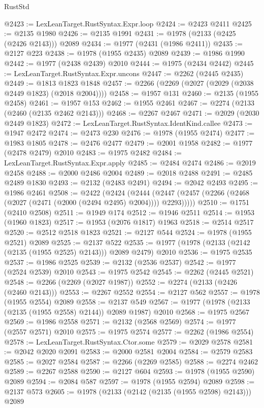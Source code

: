 \begin{lexlean}{RustStd}
\begin{coremodule}
@2423 := LexLeanTarget.RustSyntax.Expr.loop
@2424 := @2423 @2411
@2425 := @2135 @1980
@2426 := @2135 @1991
@2431 := @1978 (@2133 (@2425 (@2426 @2143))) @2089
@2434 := @1977 (@2431 (@1986 @2411))
@2435 := @2127 @223
@2438 := @1978 (@1955 @2435) @2089
@2439 := @1986 @1990
@2442 := @1977 (@2438 @2439) @2010
@2444 := @1975 (@2434 @2442)
@2445 := LexLeanTarget.RustSyntax.Expr.uncons
@2447 := @2262 (@2445 @2435)
@2449 := @1813 @1823 @1848
@2457 := @2266 (@2269 (@2027 (@2029 (@2038 @2449 @1823) (@2018 @2004))))
@2458 := @1957 @131
@2460 := @2135 (@1955 @2458)
@2461 := @1957 @153
@2462 := @1955 @2461
@2467 := @2274 (@2133 (@2460 (@2135 @2462 @2143)))
@2468 := @2267 @2467
@2471 := @2029 (@2030 @2449 @1823)
@2472 := LexLeanTarget.RustSyntax.IdentKind.callee
@2473 := @1947 @2472
@2474 := @2473 @230
@2476 := @1978 (@1955 @2474)
@2477 := @1983 @1805
@2478 := @2476 @2477
@2479 := @2001 @1958
@2482 := @1977 (@2478 @2479) @2010
@2483 := @1975 @2482
@2484 := LexLeanTarget.RustSyntax.Expr.apply
@2485 := @2484 @2474
@2486 := @2019 @2458
@2488 := @2000 @2486 @2004
@2489 := @2018 @2488
@2491 := @2485 @2489 @1830
@2493 := @2132 (@2483 @2491)
@2494 := @2042 @2493
@2495 := @1986 @2461
@2508 := @2422
    (@2424
      (@2444 (@2447 (@2457 (@2266 (@2468 (@2027 (@2471 (@2000 (@2494 @2495) @2004)))) @2293)))))
@2510 := @1751 (@2410 @2508)
@2511 := @1949 @174
@2512 := @1946 @2511
@2514 := @1953 (@1960 @1823)
@2517 := @1953 (@2076 @1817) @1963
@2518 := @2514 @2517
@2520 := @2512 @2518 @1823
@2521 := @2127 @544
@2524 := @1978 (@1955 @2521) @2089
@2525 := @2137 @522
@2535 := @1977 (@1978 (@2133 (@2142 (@2135 (@1955 @2525) @2143))) @2089 @2479) @2010
@2536 := @1975 @2535
@2537 := @1986 @2525
@2539 := @2132 (@2536 @2537)
@2542 := @1977 (@2524 @2539) @2010
@2543 := @1975 @2542
@2545 := @2262 (@2445 @2521)
@2548 := @2266 (@2269 (@2027 @1987))
@2552 := @2274 (@2133 (@2426 (@2460 @2143)))
@2553 := @2267 @2552
@2554 := @2127 @562
@2557 := @1978 (@1955 @2554) @2089
@2558 := @2137 @549
@2567 := @1977 (@1978 (@2133 (@2135 (@1955 @2558) @2144)) @2089 @1987) @2010
@2568 := @1975 @2567
@2569 := @1986 @2558
@2571 := @2132 (@2568 @2569)
@2574 := @1977 (@2557 @2571) @2010
@2575 := @1975 @2574
@2577 := @2262 (@1986 @2554)
@2578 := LexLeanTarget.RustSyntax.Ctor.some
@2579 := @2029 @2578
@2581 := @2042 @2020 @2091
@2583 := @2000 @2581 @2004
@2584 := @2579 @2583
@2585 := @2027 @2584
@2587 := @2266 (@2269 @2585)
@2588 := @2274 @2462
@2589 := @2267 @2588
@2590 := @2127 @604
@2593 := @1978 (@1955 @2590) @2089
@2594 := @2084 @587
@2597 := @1978 (@1955 @2594) @2089
@2598 := @2137 @573
@2605 := @1978 (@2133 (@2142 (@2135 (@1955 @2598) @2143))) @2089

\end{coremodule}
\end{lexlean}
